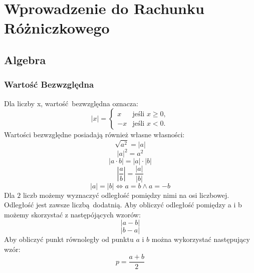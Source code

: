 \documentclass[12pt, a4paper]{article}
\begin{document}
\tableofcontents
\newpage
\section{Wprowadzenie do Rachunku Różniczkowego}
\subsection{Algebra}
\subsubsection{Wartość Bezwzględna}
Dla liczby x, wartość bezwzględna oznacza:
$$
|x| =
\begin{cases}
  x & \text{jeśli } x \geq 0, \\
  -x & \text{jeśli } x < 0.
\end{cases}
$$
Wartości bezwzględne posiadają również własne własności:
$$\sqrt{a^2} = \left|a\right|$$
$$\left|a\right|^2 = a^2$$
$$\left|a \cdot b\right| = \left| a \right| \cdot \left| b \right|$$
$$\left|\frac{a}{b}\right| = \frac{\left|a\right|}{\left|b\right|}$$
$$\left|a\right|=\left|b\right| \Longleftrightarrow a=b \wedge a = -b$$
Dla $2$ liczb możemy wyznaczyć odległość pomiędzy nimi na osi liczbowej. Odległość jest zawsze liczbą dodatnią.
Aby obliczyć odległość pomiędzy a i b możemy skorzystać z następójących wzorów:
$$\left|a-b\right|$$
$$\left|b-a\right|$$
Aby obliczyć punkt równoległy od punktu $a$ i $b$ można wykorzystać następujący wzór:
$$p = \frac{a+b}{2}$$
\end{document}

